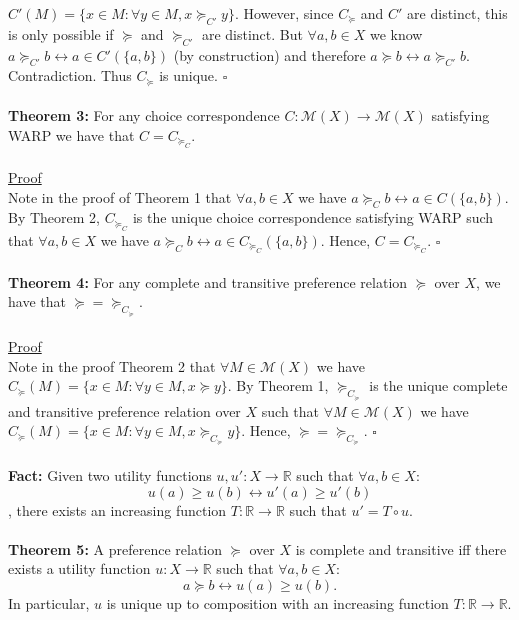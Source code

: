 \documentclass[11pt]{article}
\theoremstyle{definition}
\theoremstyle{plain}
\begin{document}
$C'(M)=\{x \in M : \forall y \in M, x \succeq_{C'}y\}.$ However, since $C_{\succeq}$ and $C'$ are distinct, this is only possible if $\succeq$ and $\succeq_{C'}$ are distinct. But $\forall a,b \in X$ we know $a \succeq_{C'} b \leftrightarrow a \in C'(\{a,b\})$ (by construction) and therefore $a\succeq b \leftrightarrow a \succeq_{C'} b$. Contradiction. Thus $C_{\succeq}$ is unique.  $\square$
\\
\\
\textbf{Theorem 3:} For any choice correspondence $C: \mathcal{M}(X) \to \mathcal{M}(X)$ satisfying WARP we have that $C=C_{\succeq_C}$.
\\
\\
\underline{Proof}
\\
Note in the proof of Theorem 1 that $\forall a,b \in X$ we have $a \succeq_C b \leftrightarrow a \in C(\{a,b\})$. By Theorem 2, $C_{\succeq_C}$ is the unique choice correspondence satisfying WARP such that $\forall a,b \in X$ we have $a \succeq_C b \leftrightarrow a \in C_{\succeq_C}(\{a,b\})$. Hence, $C=C_{\succeq_C}$. $\square$
\\
\\
\textbf{Theorem 4:} For any complete and transitive preference relation $\succeq$ over $X$, we have that $\succeq=\succeq_{C_{\succeq}}$.
\\
\\
\underline{Proof}
\\
Note in the proof Theorem 2 that $\forall M \in \mathcal{M}(X)$ we have $C_{\succeq}(M)=\{x \in M : \forall y \in M, x \succeq y\}.$ By Theorem 1, $\succeq_{C_{\succeq}}$ is the unique complete and transitive preference relation over $X$ such that $\forall M \in \mathcal{M}(X)$ we have $C_{\succeq}(M)=\{x \in M : \forall y \in M, x \succeq_{C_{\succeq}} y\}$. Hence, $\succeq=\succeq_{C_{\succeq}}$. $\square$
\\
\\
\textbf{Fact:} Given two utility functions $u,u':X \to \mathbb{R}$ such that $\forall a,b\in X$: 
$$u(a) \geq u(b) \leftrightarrow u'(a) \geq u'(b)$$
, there exists an increasing function $T:\mathbb{R} \to \mathbb{R}$ such that $u'=T \circ u$.
\\
\\
\textbf{Theorem 5:} A preference relation $\succeq$ over $X$ is complete and transitive iff there exists a utility function $u: X \to \mathbb{R}$ such that $\forall a,b \in X$:
$$ a\succeq b \leftrightarrow u(a) \geq u(b).$$
In particular, $u$ is unique up to composition with an increasing function $T:\mathbb{R} \to \mathbb{R}$.
\end{document}
